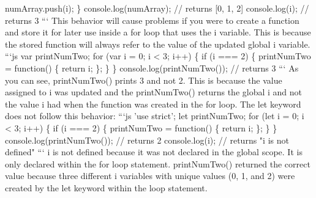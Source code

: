 \documentclass{article}%
\begin{document}
  numArray.push(i);\newline%
\}\newline%
console.log(numArray);\newline%
// returns {[}0, 1, 2{]}\newline%
console.log(i);\newline%
// returns 3\newline%
```\newline%
This behavior will cause problems if you were to create a function and store it for later use inside a for loop that uses the i variable. This is because the stored function will always refer to the value of the updated global i variable.\newline%
```js\newline%
var printNumTwo;\newline%
for (var i = 0; i < 3; i++) \{\newline%
  if (i === 2) \{\newline%
    printNumTwo = function() \{\newline%
      return i;\newline%
    \};\newline%
  \}\newline%
\}\newline%
console.log(printNumTwo());\newline%
// returns 3\newline%
```\newline%
As you can see, printNumTwo() prints 3 and not 2. This is because the value assigned to i was updated and the printNumTwo() returns the global i and not the value i had when the function was created in the for loop. The let keyword does not follow this behavior:\newline%
```js\newline%
'use strict';\newline%
let printNumTwo;\newline%
for (let i = 0; i < 3; i++) \{\newline%
  if (i === 2) \{\newline%
    printNumTwo = function() \{\newline%
      return i;\newline%
    \};\newline%
  \}\newline%
\}\newline%
console.log(printNumTwo());\newline%
// returns 2\newline%
console.log(i);\newline%
// returns "i is not defined"\newline%
```\newline%
i is not defined because it was not declared in the global scope. It is only declared within the for loop statement. printNumTwo() returned the correct value because three different i variables with unique values (0, 1, and 2) were created by the let keyword within the loop statement.\newline%
\end{document}
